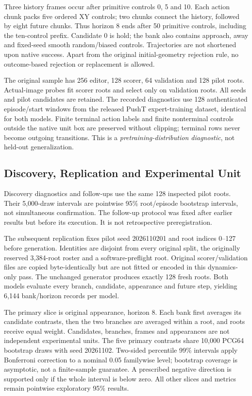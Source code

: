 Three history frames occur after primitive controls 0, 5 and 10. Each action
chunk packs five ordered XY controls; two chunks connect the history, followed
by eight future chunks. Thus horizon 8 ends after 50 primitive controls,
including the ten-control prefix. Candidate 0 is hold; the bank also contains
approach, away and fixed-seed smooth random/biased controls. Trajectories are
not shortened upon native success. Apart from the original initial-geometry
rejection rule, no outcome-based rejection or replacement is allowed.

The original sample has 256 editor, 128 scorer, 64 validation and 128 pilot roots.
Actual-image probes fit scorer roots and select only on validation roots. All
seeds and pilot candidates are retained. The recorded diagnostics use 128
authenticated episode/start windows from the released PushT expert-training
dataset, identical for both models. Finite terminal action labels and finite
nonterminal controls outside the native unit box are preserved without clipping;
terminal rows never become outgoing transitions. This is a
\emph{pretraining-distribution diagnostic}, not held-out generalization.

\subsection{Discovery, Replication and Experimental Unit}
\label{sec:uncertainty}
Discovery diagnostics and follow-ups use the same 128 inspected pilot roots.
Their 5,000-draw intervals are pointwise 95\% root/episode bootstrap intervals,
not simultaneous confirmation. The follow-up protocol was fixed after earlier
results but before its execution. It is not retrospective preregistration.

The subsequent replication fixes pilot seed 2026110201 and root indices 0--127
before generation. Identities are disjoint from every original split, the
originally reserved 3,384-root roster and a software-preflight root. Original
scorer/validation files are copied byte-identically but are not fitted or
encoded in this dynamics-only pass. The unchanged generator produces exactly
128 fresh roots. Both models evaluate every branch, candidate, appearance and
future step, yielding 6,144 bank/horizon records per model.

The primary slice is original appearance, horizon 8. Each bank first averages
its candidate contrasts, then the two branches are averaged within a root,
and roots receive equal weight. Candidates, branches, frames and appearances
are not independent experimental units. The five primary contrasts share
10,000 PCG64 bootstrap draws with seed 20261102. Two-sided percentile 99\%
intervals apply Bonferroni correction to a nominal 0.05 familywise level;
bootstrap coverage is asymptotic, not a finite-sample guarantee. A prescribed
negative direction is supported only if the whole interval is below zero.
All other slices and metrics remain pointwise exploratory 95\% results.

